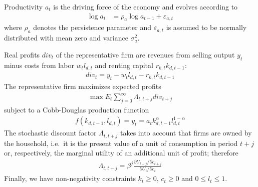 Productivity \(a_t\) is the driving force of the economy and evolves according to
\begin{align*}
\log{a_{t}} &= \rho_a \log{a_{t-1}}  + \varepsilon_{a,t}
\end{align*}
where \(\rho_a\) denotes the persistence parameter and \(\varepsilon_{a,t}\) is assumed to be normally distributed with mean zero and variance \(\sigma_a^2\).

Real profits \({div}_t\) of the representative firm are revenues from selling output \(y_t\) minus costs from labor \(w_t l_{d,t}\) and renting capital \(r_{k,t} k_{d,t-1}\):
\begin{align*}
{div}_t = y_{t} - w_{t} l_{d,t} - r_{k,t} k_{d,t-1}
\end{align*}
The representative firm maximizes expected profits
\begin{align*}
	\max E_t \sum_{j=0}^{\infty} {\Lambda}_{t,t+j} {div}_{t+j}
\end{align*}
subject to a Cobb-Douglas production function
\begin{align*}
f(k_{d,t-1}, l_{d,t}) = y_t = a_t k_{d,t-1}^\alpha l_{d,t}^{1-\alpha}
\end{align*}
The stochastic discount factor \({\Lambda}_{t,t+j}\) takes into account that firms are owned by the household,
  i.e.\ it is the present value of a unit of consumption in period \(t+j\) or, respectively,
  the marginal utility of an additional unit of profit;
  therefore
\begin{align*}
\Lambda_{t,t+j}=\beta^j \frac{\partial U_{t+j}/\partial c_{t+j}}{\partial U_{t}/\partial c_{t}}
\end{align*}
Finally, we have non-negativity constraints	\(k_t \geq 0\), \(c_t \geq 0\) and \(0 \leq l_t \leq 1\).

